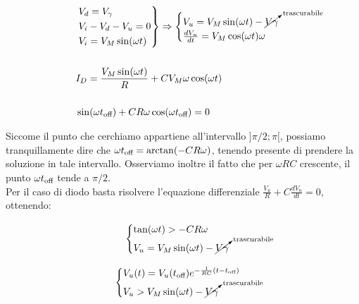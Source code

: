 \documentclass[../elettronica]{subfiles}
\begin{document}
\begin{tcolorbox}
    \begin{align*}
        &\begin{rcases}
            V_d = V_\gamma\\
            V_i - V_d - V_u = 0\\
            V_i = V_M \sin(\omega t)
        \end{rcases} \Rightarrow
        \begin{cases}
            V_u = V_M \sin(\omega t) - \cancelto{\text{trascurabile}}{V\gamma}\\
            \frac{dV_u}{dt} = V_M\cos(\omega t)\omega
        \end{cases}
        \\
        \\
        &I_D = \frac{V_M \sin(\omega t)}{R} + C V_M \omega \cos(\omega t)
        \\
        \\
        &\sin(\omega t_{\text{off}}) + CR \omega \cos(\omega t_{\text{off}}) = 0
        \\
    \end{align*}
\end{tcolorbox}

\noindent Siccome il punto che cerchiamo appartiene all'intervallo $]\pi/2;\pi[$, possiamo tranquillamente dire che
$\omega t_{\text{off}} = \arctan(-CR\omega)$, tenendo presente di prendere la soluzione in tale intervallo. Osserviamo inoltre il
fatto che per $\omega RC$ crescente, il punto $\omega t_{\text{off}}$ tende a $\pi/2$.
\\
Per il caso di diodo basta risolvere l'equazione differenziale $\frac{V_u}{R} + C\frac{dV_u}{dt} = 0$, ottenendo:
\\[10pt]
\begin{minipage}{.45\textwidth}
    \begin{tcolorbox}[title=Diodo ON]
        \[\begin{cases}
            \tan(\omega t) > - CR\omega\\
            V_u = V_M \sin(\omega t) - \cancelto{\text{trascurabile}}{V\gamma}
        \end{cases}\]
    \end{tcolorbox}
\end{minipage}
\begin{minipage}{.45\textwidth}
    \begin{tcolorbox}[title=Diodo OFF]
        \[\begin{cases}
            V_u(t) = V_u(t_{\text{off}}) e^{-\frac{1}{RC}(t - t_{\text{off}})}\\
            V_u > V_M \sin (\omega t) - \cancelto{\text{trascurabile}}{V\gamma}
        \end{cases}\]
    \end{tcolorbox}
\end{minipage}
\end{document}
